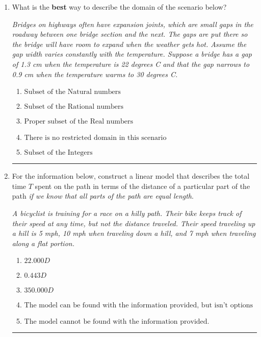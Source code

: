 \documentclass[14pt]{extbook}
\newcommand{\litem}[1]{\item#1\hspace*{-1cm}\rule{\textwidth}{0.4pt}}
\begin{document}
\begin{enumerate}
{\begin{enumerate}[label=\Alph*.]
\end{enumerate} }
\litem{
What is the \textbf{best} way to describe the domain of the scenario below?
\begin{center}
    \textit{ Bridges on highways often have expansion joints, which are small gaps in the roadway between one bridge section and the next. The gaps are put there so the bridge will have room to expand when the weather gets hot. Assume the gap width varies constantly with the temperature. Suppose a bridge has a gap of 1.3 cm when the temperature is 22 degrees C and that the gap narrows to 0.9 cm when the temperature warms to 30 degrees C. }
\end{center}
\begin{enumerate}[label=\Alph*.]
\item \( \text{Subset of the Natural numbers} \)
\item \( \text{Subset of the Rational numbers} \)
\item \( \text{Proper subset of the Real numbers} \)
\item \( \text{There is no restricted domain in this scenario} \)
\item \( \text{Subset of the Integers} \)

\end{enumerate} }
\litem{
For the information below, construct a linear model that describes the total time $T$ spent on the path in terms of the distance of a particular part of the path \textit{if we know that all parts of the path are equal length}.
\begin{center}
    \textit{ A bicyclist is training for a race on a hilly path. Their bike keeps track of their speed at any time, but not the distance traveled. Their speed traveling up a hill is 5 mph, 10 mph when traveling down a hill, and 7 mph when traveling along a flat portion. }
\end{center}
\begin{enumerate}[label=\Alph*.]
\item \( 22.000 D \)
\item \( 0.443 D \)
\item \( 350.000 D \)
\item \( \text{The model can be found with the information provided, but isn't options 1-3.} \)
\item \( \text{The model cannot be found with the information provided.} \)


\end{enumerate}}
\end{enumerate}
\end{document}
